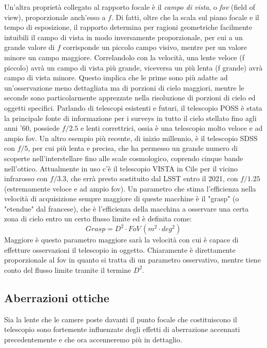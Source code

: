 Un'altra proprietà collegato al rapporto focale è il \textit{campo di vista}, o \textit{fov} (field of view), proporzionale anch'esso a $f$. Di fatti, oltre che la scala sul piano focale e il tempo di esposizione, il rapporto determina per ragioni geometriche facilmente intuibili il campo di vista in modo inversamente proporzionale, per cui a un grande valore di $f$ corrisponde un piccolo campo visivo, mentre per un valore minore un campo maggiore. Correlandolo con la velocità, una lente veloce (f piccolo) avrà un campo di vista più grande, viceversa un più lenta (f grande) avrà campo di vista minore. Questo implica che le prime sono più adatte ad un'osservazione meno dettagliata ma di porzioni di cielo maggiori, mentre le seconde sono particolarmente apprezzate nella risoluzione di porzioni di cielo ed oggetti specifici. Parlando di telescopi esistenti e futuri, il telescopio POSS è stata la principale fonte di informazione per i surveys in tutto il cielo stellato fino agli anni '60, possiede $f/2.5$ e lenti correttrici, ossia è una telescopio molto veloce e ad ampio fov. Un altro esempio più recente, di inizio millennio, è il telescopio SDSS con $f/5$, per cui più lenta e precisa, che ha permesso un grande numero di scoperte nell'interstellare fino alle scale cosmologico, coprendo cinque bande nell'ottico. Attualmente in uso c'è il telescopio VISTA in Cile per il vicino infrarosso con $f/3.3$, che errà presto sostituito dal LSST entro il 2021, con $f/1.25$ (estremamente veloce e ad ampio fov). Un parametro che stima l'efficienza nella velocità di acquisizione sempre maggiore di queste macchine è il "grasp" (o "etendue" dal francese), che è l'efficienza della macchina a osservare una certa zona di cielo entro un certo flusso limite ed è definita come:
\begin{equation*}
	Grasp = D^2 \cdot FoV \, (m^2 \cdot deg^2)
\end{equation*}
Maggiore è questo parametro maggiore sarà la velocità con cui è capace di effetture osservazioni il telescopio in oggetto. Chiaramente è direttamente proporzionale al fov in quanto si tratta di un parametro osservativo, mentre tiene conto del flusso limite tramite il termine $D^2$.

\subsection*{Aberrazioni ottiche}

Sia la lente che le camere poste davanti il punto focale che costituiscono il telescopio sono fortemente influenzate degli effetti di aberrazione accennati precedentemente e che ora accenneremo più in dettaglio.

